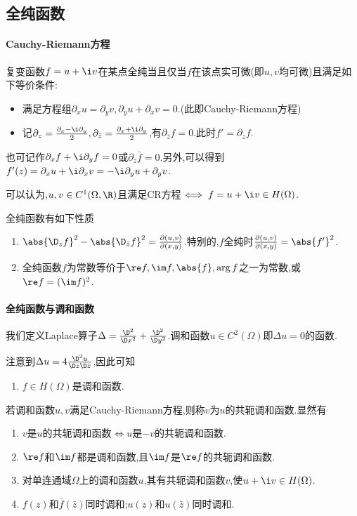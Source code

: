\documentclass{article}
\begin{document}
\subsection{全纯函数}
\paragraph{Cauchy-Riemann方程}复变函数$f=u+\i v$在某点全纯当且仅当$f$在该点实可微(即$u,v$均可微)且满足如下等价条件:
\begin{itemize}
    \item 满足方程组$\partial_x u=\partial_y v,\partial_y u+\partial_x v=0$.(此即Cauchy-Riemann方程)
    \item 记$\partial_z=\frac{\partial_x-\i \partial_y}{2},\partial_{\bar{z}}=\frac{\partial_x+\i \partial_y}{2}$,有$\partial_{\bar{z}}f=0$.此时$f'=\partial_zf$.
\end{itemize}
也可记作$\partial_x f+\i \partial_y f=0$或$\partial_z\bar{f}=0$.另外,可以得到$f'(z)=\partial_x u+\i \partial_x v=-\i\partial_y u+\partial_y v$.

可以认为,$u,v\in C^1(\Omega,\R)$且满足CR方程$\iff f=u+\i v\in H(\Omega)$.

全纯函数有如下性质\begin{enumerate}
    \item $\abs{\D_z f}^2-\abs{\D_{\bar{z}}f}^2=\frac{\partial(u,v)}{\partial(x,y)}$.特别的,$f$全纯时$\frac{\partial(u,v)}{\partial(x,y)}=\abs{f'}^2$.
    \item 全纯函数$f$为常数等价于$\re f, \im f, \abs{f}, \arg f$之一为常数,或$\re f=(\im f)^2$.
\end{enumerate}

\paragraph{全纯函数与调和函数}我们定义Laplace算子$\Delta=\frac{\D^2}{\D x^2}+\frac{\D^2}{\D y^2}$.调和函数$u\in C^2(\Omega)$即$\Delta u=0$的函数.

注意到$\Delta u=4\frac{\D^2 u}{\D z\D \bar{z}}$,因此可知
\begin{enumerate}[resume]
    \item $f\in H(\Omega)$是调和函数.
\end{enumerate}

若调和函数$u,v$满足Cauchy-Riemann方程,则称$v$为$u$的共轭调和函数.显然有
\begin{enumerate}[resume]
    \item $v$是$u$的共轭调和函数$\iff u$是$-v$的共轭调和函数.
    \item $\re f$和$\im f$都是调和函数,且$\im f$是$\re f$的共轭调和函数.
    \item 对单连通域$\Omega$上的调和函数$u$,其有共轭调和函数$v$,使$u+\i v\in H(\Omega)$.\label{Chap1.1}
    \item $f(z)$和$\bar{f}(\bar{z})$同时调和;$u(z)$和$u(\bar{z})$同时调和.
\end{enumerate}
\end{document}

